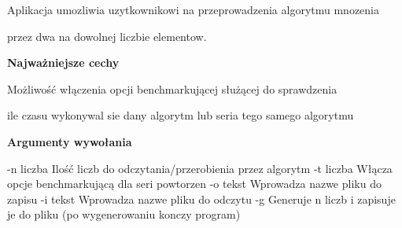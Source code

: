 Aplikacja umozliwia uzytkownikowi na przeprowadzenia algorytmu mnozenia\par
 przez dwa na dowolnej liczbie elementow.\par
\par


{\bfseries Najważniejsze cechy}\par
 Możliwość włączenia opcji benchmarkującej służącej do sprawdzenia\par
 ile czasu wykonywal sie dany algorytm lub seria tego samego algorytmu\par
\par


{\bfseries Argumenty wywołania} \begin{DoxyVerb}-n liczba       Ilość liczb do odczytania/przerobienia przez algorytm
-t liczba       Włącza opcje benchmarkującą dla seri powtorzen
-o tekst        Wprowadza nazwe pliku do zapisu
-i tekst        Wprowadza nazwe pliku do odczytu
-g              Generuje n liczb i zapisuje je do pliku (po wygenerowaniu konczy program)
\end{DoxyVerb}
 